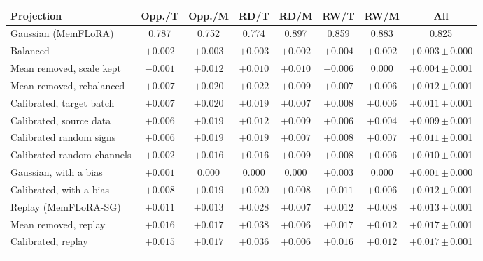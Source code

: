 \begin{tabular}{@{}l cccccc c@{}}
\toprule
Projection & Opp./T & Opp./M & RD/T & RD/M & RW/T & RW/M & All \\
\midrule
Gaussian (MemFLoRA) & 0.787 & 0.752 & 0.774 & 0.897 & 0.859 & 0.883 & 0.825 \\
\midrule
Balanced & $+0.002$ & $+0.003$ & $+0.003$ & $+0.002$ & $+0.004$ & $+0.002$ & $+0.003$\,{\scriptsize$\pm$\,0.000} \\
Mean removed, scale kept & $-0.001$ & $+0.012$ & $+0.010$ & $+0.010$ & $-0.006$ & $0.000$ & $+0.004$\,{\scriptsize$\pm$\,0.001} \\
Mean removed, rebalanced & $+0.007$ & $+0.020$ & $+0.022$ & $+0.009$ & $+0.007$ & $+0.006$ & $+0.012$\,{\scriptsize$\pm$\,0.001} \\
Calibrated, target batch & $+0.007$ & $+0.020$ & $+0.019$ & $+0.007$ & $+0.008$ & $+0.006$ & $+0.011$\,{\scriptsize$\pm$\,0.001} \\
Calibrated, source data & $+0.006$ & $+0.019$ & $+0.012$ & $+0.009$ & $+0.006$ & $+0.004$ & $+0.009$\,{\scriptsize$\pm$\,0.001} \\
Calibrated random signs & $+0.006$ & $+0.019$ & $+0.019$ & $+0.007$ & $+0.008$ & $+0.007$ & $+0.011$\,{\scriptsize$\pm$\,0.001} \\
Calibrated random channels & $+0.002$ & $+0.016$ & $+0.016$ & $+0.009$ & $+0.008$ & $+0.006$ & $+0.010$\,{\scriptsize$\pm$\,0.001} \\
Gaussian, with a bias & $+0.001$ & $0.000$ & $0.000$ & $0.000$ & $+0.003$ & $0.000$ & $+0.001$\,{\scriptsize$\pm$\,0.000} \\
Calibrated, with a bias & $+0.008$ & $+0.019$ & $+0.020$ & $+0.008$ & $+0.011$ & $+0.006$ & $+0.012$\,{\scriptsize$\pm$\,0.001} \\
Replay (MemFLoRA-SG) & $+0.011$ & $+0.013$ & $+0.028$ & $+0.007$ & $+0.012$ & $+0.008$ & $+0.013$\,{\scriptsize$\pm$\,0.001} \\
Mean removed, replay & $+0.016$ & $+0.017$ & $+0.038$ & $+0.006$ & $+0.017$ & $+0.012$ & $+0.017$\,{\scriptsize$\pm$\,0.001} \\
Calibrated, replay & $+0.015$ & $+0.017$ & $+0.036$ & $+0.006$ & $+0.016$ & $+0.012$ & $+0.017$\,{\scriptsize$\pm$\,0.001} \\
\botrule
\end{tabular}
